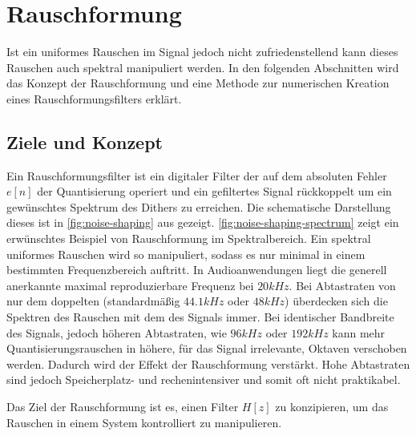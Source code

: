 \section{Rauschformung}

Ist ein uniformes Rauschen im Signal jedoch nicht zufriedenstellend kann dieses Rauschen auch spektral manipuliert werden.
In den folgenden Abschnitten wird das Konzept der Rauschformung und eine Methode zur numerischen Kreation eines Rauschformungsfilters erklärt.

\subsection{Ziele und Konzept}

Ein Rauschformungsfilter ist ein digitaler Filter der auf dem absoluten Fehler $e[n]$ der Quantisierung operiert und ein gefiltertes Signal rückkoppelt um ein gewünschtes Spektrum des Dithers zu erreichen.
Die schematische Darstellung dieses ist in \autoref{fig:noise-shaping} aus \autocite{noise-shaping} gezeigt.
\autoref{fig:noise-shaping-spectrum} zeigt ein erwünschtes Beispiel von Rauschformung im Spektralbereich.
Ein spektral uniformes Rauschen wird so manipuliert, sodass es nur minimal in einem bestimmten Frequenzbereich auftritt.
In Audioanwendungen liegt die generell anerkannte maximal reproduzierbare Frequenz bei $20\si{kHz}$.
Bei Abtastraten von nur dem doppelten (standardmäßig $44.1\si{kHz}$ oder $48\si{kHz}$) überdecken sich die Spektren des Rauschen mit dem des Signals immer.
Bei identischer Bandbreite des Signals, jedoch höheren Abtastraten, wie $96\si{kHz}$ oder $192\si{kHz}$ kann mehr Quantisierungsrauschen in höhere, für das Signal irrelevante, Oktaven verschoben werden.
Dadurch wird der Effekt der Rauschformung verstärkt.
Hohe Abtastraten sind jedoch Speicherplatz- und rechenintensiver und somit oft nicht praktikabel.

Das Ziel der Rauschformung ist es, einen Filter $H[z]$ zu konzipieren, um das Rauschen in einem System kontrolliert zu manipulieren.

